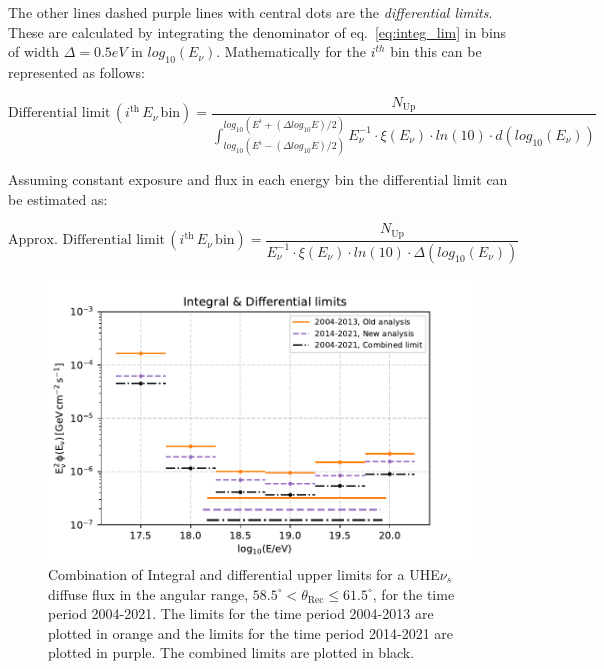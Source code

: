 The other lines dashed purple lines with central dots are the \textit{differential limits}. These are calculated by integrating the denominator of eq.~\ref{eq:integ_lim} in bins of width $\Delta = 0.5eV$ in $log_{10}(E_{\nu})$. Mathematically for the $i^{th}$ bin this can be represented as follows:

\begin{equation}
  \label{eq:diff_lim}
  \text{Differential limit} \, (i^{\text{th}} \, E_{\nu} \, \text{bin})  = \frac{N_{\text{Up}}}{\int_{log_{10}(E^i - (\Delta log_{10}E)/2)}^{log_{10}(E^i + (\Delta log_{10}E)/2)} E^{-1}_{\nu} \cdot \xi(E_{\nu}) \cdot ln(10) \cdot d(log_{10}(E_{\nu}))}
\end{equation}

Assuming constant exposure and flux in each energy bin the differential limit can be estimated as:

\begin{equation}
  \label{eq:diff_lim_approx}
 \text{Approx. Differential limit} \, (i^{\text{th}} \, E_{\nu} \, \text{bin})  = \frac{N_{\text{Up}}}{E^{-1}_{\nu} \cdot \xi(E_{\nu}) \cdot ln(10) \cdot \Delta (log_{10}(E_{\nu}))}
\end{equation}
\begin{figure}[t!]
  \centering
  \includegraphics[width=14.5cm]{thesis_figures/ExpLimits/Integ_DiffLimit_comp_combined_new_sim_optim.pdf}
  \caption{Combination of Integral and differential upper limits for a UHE$\nu_s$ diffuse flux in the angular range, $ 58.5^{\circ} <\theta_{\text{Rec}} \leq 61.5^{\circ}$, for the time period 2004-2021. The limits for the time period 2004-2013 are plotted in orange and the limits for the time period 2014-2021 are plotted in purple. The combined limits are plotted in black.}
  \label{fig:Limit_comp_2}
\end{figure}

